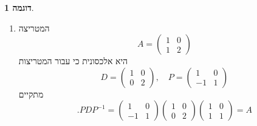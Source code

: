 \documentclass[12pt]{report}
\theoremstyle{plain}
\theoremstyle{definition}
\newtheorem{example}{דוגמה}[chapter]
\newcommand{\0}{\mathbf{0}}
\begin{document}
\begin{example}\
\begin{enumerate}[label=\alph*.]
\item 
המטריצה
$$
A=\begin{pmatrix}
1 & 0 \\
1 & 2  
\end{pmatrix}
$$
היא אלכסונית כי עבור המטריצות
$$
D=\begin{pmatrix}
1 & 0 \\
0 & 2  
\end{pmatrix},\quad P=\begin{pmatrix}
1 & 0 \\
-1 & 1  
\end{pmatrix}
$$
מתקיים
$$
.PDP^{-1}=\begin{pmatrix}
1 & 0 \\
-1 & 1  
\end{pmatrix}\begin{pmatrix}
1 & 0 \\
0 & 2  
\end{pmatrix}\begin{pmatrix}
1 & 0 \\
1 & 1  
\end{pmatrix}=A
$$



\end{enumerate}
\end{example}
\end{document}

